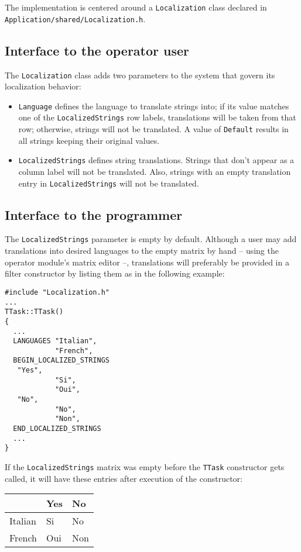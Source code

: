 \documentclass[12pt,letterpaper]{article}
\begin{document}
The implementation is centered around a \texttt{Localization} class declared in \texttt{Application/shared/Localization.h}.

\subsection{Interface to the operator user}

The \texttt{Localization} class adds two parameters to the system that govern its localization
behavior: 
\begin{itemize}
\item
\texttt{Language} defines the language to translate strings
into; if its value matches one of the \texttt{LocalizedStrings} row
labels, translations will be taken from that row; otherwise,
strings will not be translated.
A value of \texttt{Default} results in all strings keeping their original values.
\item
\texttt{LocalizedStrings} defines string translations. Strings that
don't appear as a column label will not be translated.
Also, strings with an empty translation entry in \texttt{LocalizedStrings}
will not be translated.
\end{itemize}

\subsection{Interface to the programmer}

The \texttt{LocalizedStrings} parameter is empty by default.
Although a user may add translations into desired languages to the empty matrix by hand -- using the operator module's matrix editor --,
translations will preferably be provided in a filter constructor by listing them as in the following example:
\begin{verbatim}
#include "Localization.h"
...
TTask::TTask()
{
  ...
  LANGUAGES "Italian",
            "French",
  BEGIN_LOCALIZED_STRINGS
   "Yes",
            "Si",
            "Oui",
   "No",
            "No",
            "Non",
  END_LOCALIZED_STRINGS
  ...
}
\end{verbatim}

If the \texttt{LocalizedStrings} matrix was empty before the \texttt{TTask} constructor gets called, it will have these entries after execution of the constructor:

\begin{center}
\begin{tabular}[t]{l|ll}
          & Yes   & No  \\ \hline
  Italian & Si    & No  \\
  French  & Oui   & Non \\
\end{tabular}
\end{center}
\end{document}
